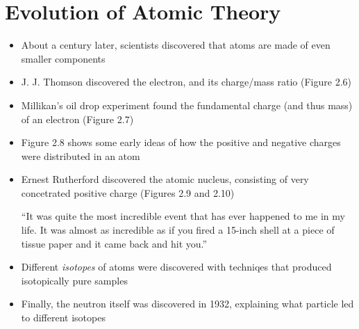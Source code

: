 \documentclass[12pt, openany, letterpaper]{memoir}
\begin{document}
\section{Evolution of Atomic Theory}
\begin{itemize}
  \item About a century later, scientists discovered that atoms are made of even smaller components
  \item J. J. Thomson discovered the electron, and its charge/mass ratio (Figure 2.6)
  \item Millikan's oil drop experiment found the fundamental charge (and thus mass) of an electron (Figure 2.7)
  \item Figure 2.8 shows some early ideas of how the positive and negative charges were distributed in an atom
  \item Ernest Rutherford discovered the atomic nucleus, consisting of very concetrated positive charge (Figures 2.9 and 2.10)

    ``It was quite the most incredible event that has ever happened to me in my life. It was almost as incredible as if you fired a 15-inch shell at a piece of tissue paper and it came back and hit you.''
  \item Different \emph{isotopes} of atoms were discovered with techniqes that produced isotopically pure samples
  \item Finally, the neutron itself was discovered in 1932, explaining what particle led to different isotopes
\end{itemize}
\end{document}
